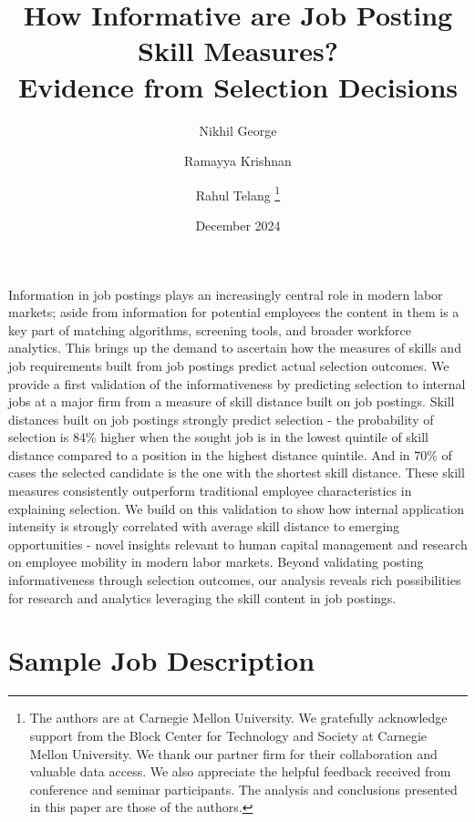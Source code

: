 \documentclass[letterpaper,11pt,leqno]{article}
\newcommand{\bib}{references.bib}
\begin{document}
\title{How Informative are Job Posting Skill Measures? \\ Evidence from Selection Decisions}
\author{%
 Nikhil George \and Ramayya Krishnan \and Rahul Telang%
 \thanks{The authors are at Carnegie Mellon University. We gratefully acknowledge support from the Block Center for Technology and Society at Carnegie Mellon University. We thank our partner firm for their collaboration and valuable data access. We also appreciate the helpful feedback received from conference and seminar participants. The analysis and conclusions presented in this paper are those of the authors.}%
}
\date{December 2024}

\begin{titlepage}
\maketitle

Information in job postings plays an increasingly central role in modern labor markets; aside from information for 
potential employees the content in them is a key part of matching algorithms, screening tools, and broader workforce 
analytics. This brings up the demand to ascertain how the measures of skills and job requirements built from job postings 
predict actual selection outcomes. We provide a first validation of the informativeness by predicting selection to internal 
jobs at a major firm from a measure of skill distance built on job postings. Skill distances built on job postings 
strongly predict selection - the probability of selection is 84\% higher when the sought job is in the lowest quintile 
of skill distance compared to a position in the highest distance quintile. And in 70\% of cases the selected candidate 
is the one with the shortest skill distance. These skill measures consistently outperform traditional employee 
characteristics in explaining selection. We build on this validation to show how internal application intensity is 
strongly correlated with average skill distance to emerging opportunities - novel insights relevant to human capital 
management and research on employee mobility in modern labor markets. Beyond validating posting informativeness through 
selection outcomes, our analysis reveals rich possibilities for research and analytics leveraging the skill content 
in job postings.

\end{titlepage}











\appendix
\section{Sample Job Description}

\end{document}
